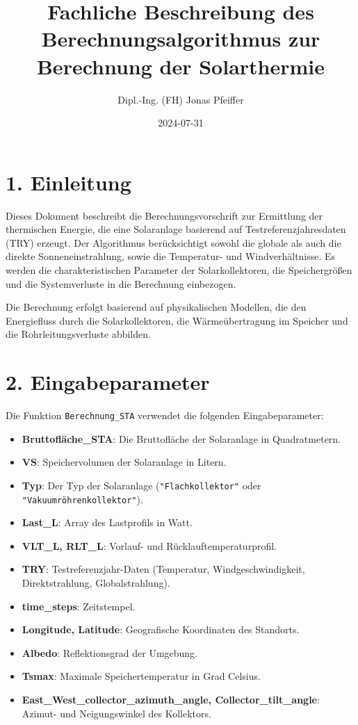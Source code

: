 \documentclass{article}
\title{Fachliche Beschreibung des Berechnungsalgorithmus zur Berechnung der Solarthermie}
\author{Dipl.-Ing. (FH) Jonas Pfeiffer}
\date{2024-07-31}
\begin{document}
\maketitle

\section*{1. Einleitung}

Dieses Dokument beschreibt die Berechnungsvorschrift zur Ermittlung der thermischen Energie, die eine Solaranlage basierend auf Testreferenzjahresdaten (TRY) erzeugt. Der Algorithmus berücksichtigt sowohl die globale als auch die direkte Sonneneinstrahlung, sowie die Temperatur- und Windverhältnisse. Es werden die charakteristischen Parameter der Solarkollektoren, die Speichergrößen und die Systemverluste in die Berechnung einbezogen. 

Die Berechnung erfolgt basierend auf physikalischen Modellen, die den Energiefluss durch die Solarkollektoren, die Wärmeübertragung im Speicher und die Rohrleitungsverluste abbilden.

\section*{2. Eingabeparameter}

Die Funktion \texttt{Berechnung\_STA} verwendet die folgenden Eingabeparameter:

\begin{itemize}
    \item \textbf{Bruttofläche\_STA}: Die Bruttofläche der Solaranlage in Quadratmetern.
    \item \textbf{VS}: Speichervolumen der Solaranlage in Litern.
    \item \textbf{Typ}: Der Typ der Solaranlage (\texttt{"Flachkollektor"} oder \texttt{"Vakuumröhrenkollektor"}).
    \item \textbf{Last\_L}: Array des Lastprofils in Watt.
    \item \textbf{VLT\_L, RLT\_L}: Vorlauf- und Rücklauftemperaturprofil.
    \item \textbf{TRY}: Testreferenzjahr-Daten (Temperatur, Windgeschwindigkeit, Direktstrahlung, Globalstrahlung).
    \item \textbf{time\_steps}: Zeitstempel.
    \item \textbf{Longitude, Latitude}: Geografische Koordinaten des Standorts.
    \item \textbf{Albedo}: Reflektionsgrad der Umgebung.
    \item \textbf{Tsmax}: Maximale Speichertemperatur in Grad Celsius.
    \item \textbf{East\_West\_collector\_azimuth\_angle, Collector\_tilt\_angle}: Azimut- und Neigungswinkel des Kollektors.
\end{itemize}
\end{document}
